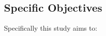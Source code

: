 \subsection{Specific Objectives}
\label{sec:specificobjectives}

\begin{comment}
How to formulate your research objectives:
1. Identify what research steps do you need to perform to achieve your general objective.
2. Identify the questions that must be answered for you to achieve your general objective.
    Thereafter, convert these questions into action statements

Example #1:

Research Question:
  What are the general features of a web-based learning environment?

Specific Objective:
   To review existing web-based learning environment that teaches language learning for children


Example #2:

Research Question:
   How will you represent commonsense knowledge for use by computer systems?

Specific Objective:
   To identify knowledge representation approaches used by existing story generation systems

Example #3:
Research Question:
   What types of storytelling knowledge are needed to generate stories?

Specific Objective:
    To identify the different types of storytelling knowledge used in generating stories

Example #4:
Research Question:
    What machine learning approaches will you utilize?

Specific Objective:
    To determine existing machine learning algorithms [that can be used in training the computer system to detect cyberbullying cases] 

Example #5: Research Question:
    How will your research output be evaluated?

Specific Objective:
    To define evaluation metrics for validating the accuracy of the translation

\end{comment}

Specifically this study aims to:

